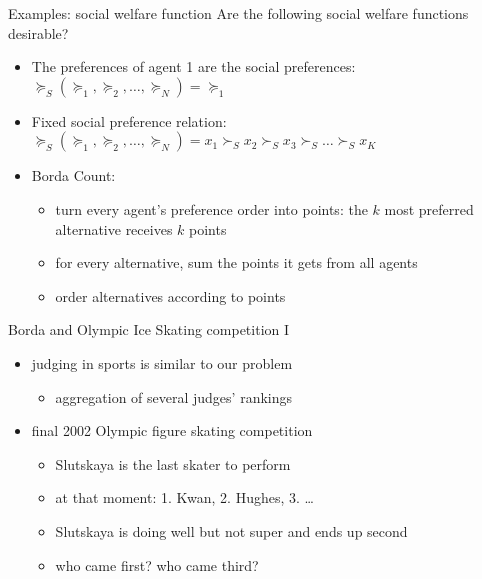 \documentclass[bigger]{beamer}
\begin{document}
\begin{frame}[label={sec:org854372b}]{Examples: social welfare function}
Are the following social welfare functions desirable?
\begin{itemize}
\item The preferences of agent 1 are the social preferences: \(\succeq_S (\succeq_1,\succeq_2,\dots,\succeq_N)=\succeq_1\)
\item Fixed social preference relation: \(\succeq_S (\succeq_1,\succeq_2,\dots,\succeq_N)=x_1\succ_S x_2\succ_S x_3\succ_S\dots\succ_S x_K\)
\item Borda Count:
\begin{itemize}
\item turn every agent's preference order into points: the \(k\) most preferred alternative receives \(k\) points
\item for every alternative, sum the points it gets from all agents
\item order alternatives according to points
\end{itemize}
\end{itemize}
\end{frame}
\begin{frame}[label={sec:orga41fd6a}]{Borda and Olympic Ice Skating  competition I}
\begin{itemize}
\item judging in sports is similar to our problem
\begin{itemize}
\item aggregation of several judges' rankings
\end{itemize}
\item final 2002 Olympic figure skating competition
\begin{itemize}
\item Slutskaya is the last skater to perform
\item at that moment: 1. Kwan, 2. Hughes, 3. \ldots{}
\item Slutskaya is doing well but not super and ends up second
\item who came first? who came third?
\end{itemize}
\end{itemize}
\end{frame}
\end{document}
